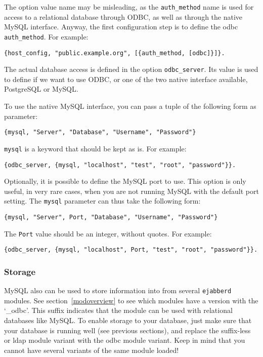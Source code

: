 \documentclass[a4paper,10pt]{book}
\newcommand{\ind}[1]{\begin{latexonly}\index{#1}\end{latexonly}}
\newcommand{\term}[1]{\texttt{#1}}
\newcommand{\ejabberd}{\texttt{ejabberd}}
\begin{document}
The option value name may be misleading, as the \term{auth\_method} name is used
for access to a relational database through ODBC, as well as through the native
MySQL interface. Anyway, the first configuration step is to define the odbc
\term{auth\_method}. For example:
\begin{verbatim}
{host_config, "public.example.org", [{auth_method, [odbc]}]}.
\end{verbatim}

The actual database access is defined in the option \term{odbc\_server}. Its
value is used to define if we want to use ODBC, or one of the two native
interface available, PostgreSQL or MySQL.

To use the native MySQL interface, you can pass a tuple of the following form as
parameter:
\begin{verbatim}
{mysql, "Server", "Database", "Username", "Password"}
\end{verbatim}

\term{mysql} is a keyword that should be kept as is. For example:
\begin{verbatim}
{odbc_server, {mysql, "localhost", "test", "root", "password"}}.
\end{verbatim}

Optionally, it is possible to define the MySQL port to use. This
option is only useful, in very rare cases, when you are not running
MySQL with the default port setting. The \term{mysql} parameter
can thus take the following form:
\begin{verbatim}
{mysql, "Server", Port, "Database", "Username", "Password"}
\end{verbatim}

The \term{Port} value should be an integer, without quotes. For example:
\begin{verbatim}
{odbc_server, {mysql, "localhost", Port, "test", "root", "password"}}.
\end{verbatim}


\subsubsection{Storage}
\label{mysqlstorage}
\ind{MySQL!storage}

MySQL also can be used to store information into from several \ejabberd{}
modules. See section~\ref{modoverview} to see which modules have a version
with the `\_odbc'. This suffix indicates that the module can be used with
relational databases like MySQL. To enable storage to your database, just make
sure that your database is running well (see previous sections), and replace the
suffix-less or ldap module variant with the odbc module variant. Keep in mind
that you cannot have several variants of the same module loaded!
\end{document}
